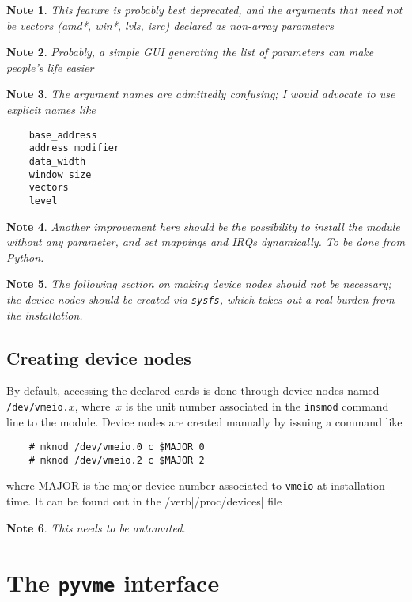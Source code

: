 \documentclass{article}
\newtheorem{note}{Note}
\begin{document}
\begin{note}
This feature is probably best deprecated, and the arguments that need
not be vectors (amd*, win*, lvls, isrc) declared as non-array parameters
\end{note}
\begin{note}
Probably, a simple GUI generating the list of parameters can make
people's life easier
\end{note}
\begin{note}
The argument names are admittedly confusing; I would advocate to use
explicit names like \begin{rm}
\begin{Verbatim}
    base_address
    address_modifier
    data_width
    window_size
    vectors
    level
\end{Verbatim}
\end{rm}
\end{note}
\begin{note}
Another improvement here should be the possibility to install the module
without any parameter, and set mappings and IRQs dynamically. To be done
from Python.
\end{note}
\begin{note}
The following section on making device nodes should not be necessary;
the device nodes should be created via \texttt{sysfs}, which takes out a
real burden from the installation.
\end{note}

\subsection{Creating device nodes}

By default, accessing the declared cards is done through device nodes
named \verb|/dev/vmeio.|$x$, where~$x$ is the unit number associated in
the \verb|insmod| command line to the module. Device nodes are created
manually by issuing a command like
\begin{Verbatim}
    # mknod /dev/vmeio.0 c $MAJOR 0
    # mknod /dev/vmeio.2 c $MAJOR 2
\end{Verbatim}
where MAJOR is the major device number associated to \verb|vmeio| at
installation time. It can be found out in the /verb|/proc/devices| file

\begin{note}
This needs to be automated.
\end{note}

\section{The \texttt{pyvme} interface}
\end{document}
